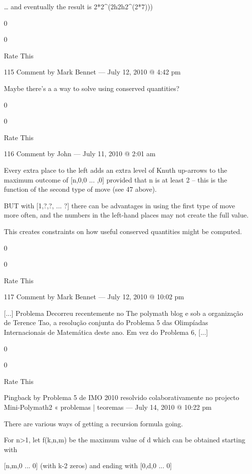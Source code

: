 {            … and eventually the result is 2*2^(2^^(2^^(2^(2*7)))
             
            0
             
            0
             
            Rate This

           115  Comment by Mark Bennet — July 12, 2010 @ 4:42 pm

    Maybe there’s a a way to solve using conserved quantities?
     
    0
     
    0
     
    Rate This

    116 Comment by John — July 11, 2010 @ 2:01 am

        Every extra place to the left adds an extra level of Knuth up-arrows to the maximum outcome of [n,0,0 ... ,0] provided that n is at least 2 – this is the function of the second type of move (see 47 above).

        BUT with [1,?,?, ... ?] there can be advantages in using the first type of move more often, and the numbers in the left-hand places may not create the full value.

        This creates constraints on how useful conserved quantities might be computed.
         
        0
         
        0
         
        Rate This

        117 Comment by Mark Bennet — July 12, 2010 @ 10:02 pm

    [...] Problema Decorreu recentemente no The polymath blog e sob a organização de Terence Tao, a resolução conjunta do Problema 5 das Olimpíadas Internacionais de Matemática deste ano. Em vez do Problema 6, [...]
     
    0
     
    0
     
    Rate This

    Pingback by Problema 5 de IMO 2010 resolvido colaborativamente no projecto Mini-Polymath2 « problemas | teoremas — July 14, 2010 @ 10:22 pm

    There are various ways of getting a recursion formula going.

    For n>1, let f(k,n,m) be the maximum value of d which can be obtained starting with

    [n,m,0 ... 0] (with k-2 zeros)
    and ending with
    [0,d,0 ... 0]

}
